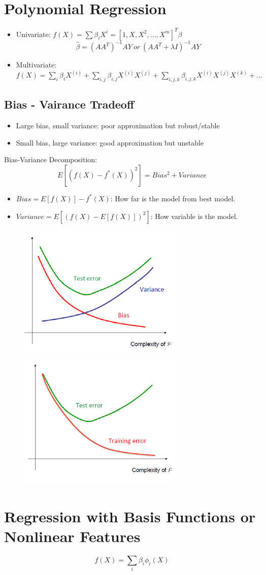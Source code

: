 \documentclass[letterpaper,10pt]{article}
\begin{document}
\section{Polynomial Regression}

\begin{itemize}
	\item Univariate: $f(X)=\sum{\beta_iX^i}=[1, X, X^2, \dots, X^m]^T\beta$
	$$\hat{\beta}=(AA^T)^{-1}AY~or~(AA^T+\lambda I)^{-1}AY$$
	\item Multivariate: $f(X) = \sum_i{\beta_i X^{(i)}} + \sum_{i,j}{\beta_{i,j} X^{(i)} X^{(j)}}+\sum_{i,j,k}{\beta_{i,j,k} X^{(i)} X^{(j)}X^{(k)}}+\dots$
\end{itemize}


\subsection{Bias - Vairance Tradeoff}
\begin{itemize}
	\item Large bias, small variance: poor approximation but robust/stable
	\item Small bias, large variance: good approximation but unstable
\end{itemize}

Bias-Variance Decomposition:
$$E[(f(X)-f^*(X))^2] = Bias^2 + Variance$$
\begin{itemize}
	\item $Bias = E[f(X)] - f^*(X)$: How far is the model from best model.
	\item $Variance = E[(f(X)-E[f(X)])^2]$: How variable is the model.
\end{itemize}

\begin{figure}[!h]
	\centering
	\includegraphics[width=8cm]{./img/testerror.png}
	\includegraphics[width=8cm]{./img/trainerror.png}
\end{figure}

\section{Regression with Basis Functions or Nonlinear Features}

$$f(X)=\sum_i \beta_i \phi_i(X)$$
\end{document}
